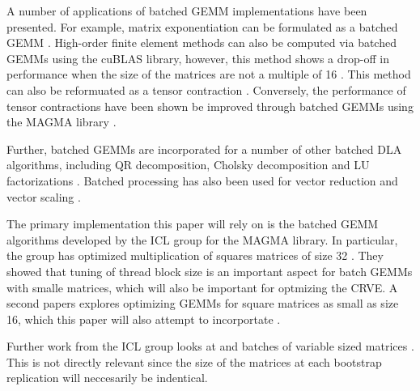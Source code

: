 \documentclass[11pt]{article}       %
\begin{document}
A number of applications of batched GEMM implementations have been presented. For example, matrix exponentiation can be formulated as a batched GEMM \cite{lopez2014batch}. High-order finite element methods can also be computed via batched GEMMs using the cuBLAS library, however, this method shows a drop-off in performance when the size of the matrices are not a multiple of 16 \cite{jhurani2015gemm}. This method can also be reformuated as a tensor contraction \cite{shi2016tensor}. Conversely, the performance of tensor contractions have been shown be improved through batched GEMMs using the MAGMA library \cite{abdelfattah2016high}.

Further, batched GEMMs are incorporated for a number of other batched DLA algorithms, including QR decomposition, Cholsky decomposition and LU factorizations \cite{haidar2015batched} \cite{dong2016batchfact} \cite{abdelfattah2015batchcholesky} \cite{dong2014factor} \cite{dong2014chols}. Batched processing has also been used for vector reduction and vector scaling \cite{polok2012fast}.

The primary implementation this paper will rely on is the batched GEMM algorithms developed by the ICL group for the MAGMA library. In particular, the group has optimized multiplication of squares matrices of size 32 \cite{dongarra2016performance}. They showed that tuning of thread block size is an important aspect for batch GEMMs with smalle matrices, which will also be important for optmizing the CRVE. A second papers explores optimizing GEMMs for square matrices as small as size 16, which this paper will also attempt to incorportate \cite{masliah2016high}.

Further work from the ICL group looks at and batches of variable sized matrices \cite{abdelfattah2016variablebatch}. This is not directly relevant since the size of the matrices at each bootstrap replication will neccesarily be indentical. 



\end{document}

